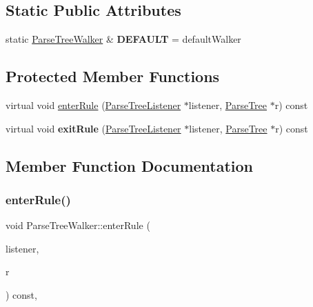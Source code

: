 \subsection*{Static Public Attributes}
\begin{DoxyCompactItemize}
\item 
\mbox{\label{classantlr4_1_1tree_1_1ParseTreeWalker_a473f4746776ea776418bada651f534db}} 
static \hyperlink{classantlr4_1_1tree_1_1ParseTreeWalker}{Parse\+Tree\+Walker} \& {\bfseries D\+E\+F\+A\+U\+LT} = default\+Walker
\end{DoxyCompactItemize}
\subsection*{Protected Member Functions}
\begin{DoxyCompactItemize}
\item 
virtual void \hyperlink{classantlr4_1_1tree_1_1ParseTreeWalker_a18b01a6f9d467e6b5895011d18e620c1}{enter\+Rule} (\hyperlink{classantlr4_1_1tree_1_1ParseTreeListener}{Parse\+Tree\+Listener} $\ast$listener, \hyperlink{classantlr4_1_1tree_1_1ParseTree}{Parse\+Tree} $\ast$r) const
\item 
\mbox{\label{classantlr4_1_1tree_1_1ParseTreeWalker_acb3a293e3f2e558eb7a351097f7897a9}} 
virtual void {\bfseries exit\+Rule} (\hyperlink{classantlr4_1_1tree_1_1ParseTreeListener}{Parse\+Tree\+Listener} $\ast$listener, \hyperlink{classantlr4_1_1tree_1_1ParseTree}{Parse\+Tree} $\ast$r) const
\end{DoxyCompactItemize}


\subsection{Member Function Documentation}
\mbox{\label{classantlr4_1_1tree_1_1ParseTreeWalker_a18b01a6f9d467e6b5895011d18e620c1}} 
\subsubsection{\texorpdfstring{enter\+Rule()}{enterRule()}}
{\footnotesize\ttfamily void Parse\+Tree\+Walker\+::enter\+Rule (\begin{DoxyParamCaption}\item[{\hyperlink{classantlr4_1_1tree_1_1ParseTreeListener}{Parse\+Tree\+Listener} $\ast$}]{listener,  }\item[{\hyperlink{classantlr4_1_1tree_1_1ParseTree}{Parse\+Tree} $\ast$}]{r }\end{DoxyParamCaption}) const\hspace{0.3cm}{\ttfamily [protected]}, {\ttfamily [virtual]}}

